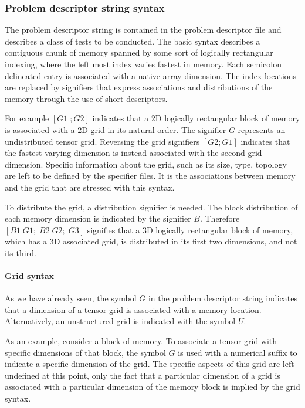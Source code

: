 \subsubsection{Problem descriptor string syntax}
The problem descriptor string is contained in the problem descriptor file and describes a 
class of tests to be conducted. 
The basic syntax describes a contiguous chunk of memory spanned by some sort of logically 
rectangular indexing, where the left most index varies fastest in memory. 
Each semicolon delineated entry is associated with a native array dimension. 
The index locations are replaced by signifiers that express associations and distributions 
of the memory through the use of short descriptors. 

For example $[ G1 \; ; G2 ]$ indicates that a 2D logically rectangular block of memory 
is associated with a 2D grid in its natural order. 
The signifier $G$ represents an undistributed tensor grid. 
Reversing the grid signifiers $[ G2; G1 ]$ indicates that the fastest varying dimension 
is instead associated with the second grid dimension. 
Specific information about the grid, such as its size, type, topology are left to be defined 
by the specifier files. It is the associations between memory and the grid that are stressed with this syntax.

To distribute the grid, a distribution signifier is needed. 
The block distribution of each memory dimension is indicated by the signifier $B$. 
Therefore $[B1 \; G1; \; B2 \; G2; \; G3]$ signifies that a 3D logically rectangular block of memory, 
which has a 3D associated grid, is distributed in its first two dimensions, and not its third.

\paragraph{Grid syntax}
As we have already seen, the symbol $G$ in the problem descriptor string indicates 
that a dimension of a tensor grid is associated with a memory location. 
Alternatively, an unstructured grid is indicated with the symbol $U$.

As an example, consider a block of memory. To associate a tensor grid with specific dimensions of that block, 
the symbol $G$ is used with a numerical  suffix  to indicate a specific dimension of the grid. 
The specific aspects of this grid are left undefined at this point, only the fact 
that a particular dimension of a grid is associated with a particular dimension 
of the memory block is implied by the grid syntax. 

